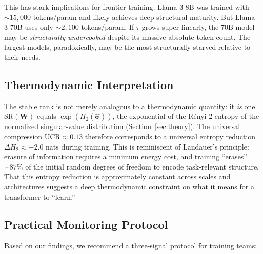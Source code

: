 This has stark implications for frontier training. Llama-3-8B was trained with ${\sim}15{,}000$ tokens/param and likely achieves deep structural maturity. But Llama-3-70B uses only ${\sim}2{,}100$ tokens/param. If $\tau$ grows super-linearly, the 70B model may be \emph{structurally undercooked} despite its massive absolute token count. The largest models, paradoxically, may be the most structurally starved relative to their needs.

\subsection{Thermodynamic Interpretation}

The stable rank is not merely analogous to a thermodynamic quantity: it \emph{is} one. $\text{SR}(\mathbf{W})$ equals $\exp(H_2(\hat{\boldsymbol{\sigma}}))$, the exponential of the R\'{e}nyi-2 entropy of the normalized singular-value distribution (Section~\ref{sec:theory}). The universal compression $\text{UCR} \approx 0.13$ therefore corresponds to a universal entropy reduction $\Delta H_2 \approx -2.0$ nats during training. This is reminiscent of Landauer's principle: erasure of information requires a minimum energy cost, and training ``erases'' ${\sim}87\%$ of the initial random degrees of freedom to encode task-relevant structure. That this entropy reduction is approximately constant across scales and architectures suggests a deep thermodynamic constraint on what it means for a transformer to ``learn.''

\subsection{Practical Monitoring Protocol}

Based on our findings, we recommend a three-signal protocol for training teams:


